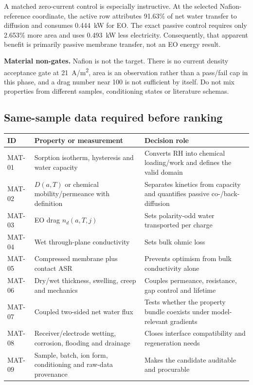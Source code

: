 \documentclass[10pt,a4paper]{article}
\begin{document}
A matched zero-current control is especially instructive. At the selected
Nafion-reference coordinate, the active row attributes 91.63\% of net water
transfer to diffusion and consumes 0.444~kW for EO. The exact passive control
requires only 2.653\% more area and uses 0.493~kW less electricity.
Consequently, that apparent benefit is primarily passive membrane transfer,
not an EO energy result.

\begin{warningbox}
\textbf{Material non-gates.} Nafion is not the target. There is no current
density acceptance gate at 21~A/m\textsuperscript{2}, area is an observation
rather than a pass/fail cap in this phase, and a drag number near 100 is not
sufficient by itself. Do not mix properties from different samples,
conditioning states or literature schemas.
\end{warningbox}

\subsection{Same-sample data required before ranking}

\begin{center}\small
\begin{tabularx}{\textwidth}{@{}p{19mm}p{48mm}Y@{}}
\toprule
\textbf{ID} & \textbf{Property or measurement} & \textbf{Decision role} \\
\midrule
MAT-01 & Sorption isotherm, hysteresis and water capacity & Converts RH into
chemical loading/work and defines the valid domain \\
MAT-02 & $D(a,T)$ or chemical mobility/permeance with definition & Separates
kinetics from capacity and quantifies passive co-/back-diffusion \\
MAT-03 & EO drag $n_d(a,T,j)$ & Sets polarity-odd water transported per charge \\
MAT-04 & Wet through-plane conductivity & Sets bulk ohmic loss \\
MAT-05 & Compressed membrane plus contact ASR & Prevents optimism from bulk
conductivity alone \\
MAT-06 & Dry/wet thickness, swelling, creep and mechanics & Couples permeance,
resistance, gap control and lifetime \\
MAT-07 & Coupled two-sided net water flux & Tests whether the property bundle
coexists under model-relevant gradients \\
MAT-08 & Receiver/electrode wetting, corrosion, flooding and drainage & Closes
interface compatibility and regeneration needs \\
MAT-09 & Sample, batch, ion form, conditioning and raw-data provenance & Makes
the candidate auditable and procurable \\
\bottomrule
\end{tabularx}
\end{center}
\end{document}
